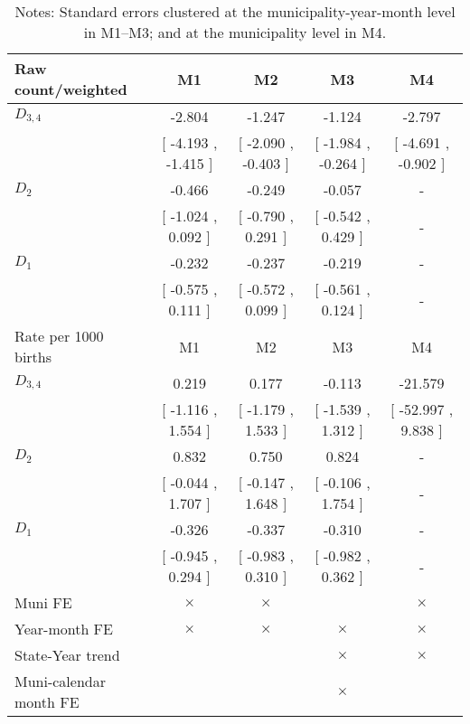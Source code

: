 \begin{table}[!ht]
\centering
\caption{Effects of Drought on macrosom}\label{tab:twfe_macrosom}
\fontsize{10pt}{12pt}\selectfont
\begin{tabular}{lcccc}
\toprule
  Raw count/weighted &\multicolumn{1}{c}{M1}&\multicolumn{1}{c}{M2}&\multicolumn{1}{c}{M3}&\multicolumn{1}{c}{M4} \\
\midrule
 $ D_{3,4} $ &    -2.804 &    -1.247 &    -1.124 &    -2.797 \\ 
 & [    -4.193 ,    -1.415 ] & [    -2.090 ,    -0.403 ] & [    -1.984 ,    -0.264 ] & [    -4.691 ,    -0.902 ] \\ 
\addlinespace
 $ D_2 $ &    -0.466 &    -0.249 &    -0.057 & - \\ 
 & [    -1.024 ,     0.092 ] & [    -0.790 ,     0.291 ] & [    -0.542 ,     0.429 ] & - \\ 
\addlinespace
 $ D_1 $ &    -0.232 &    -0.237 &    -0.219 & - \\ 
 & [    -0.575 ,     0.111 ] & [    -0.572 ,     0.099 ] & [    -0.561 ,     0.124 ] & - \\ 
\addlinespace
\midrule
  Rate per 1000 births &\multicolumn{1}{c}{M1}&\multicolumn{1}{c}{M2}&\multicolumn{1}{c}{M3}&\multicolumn{1}{c}{M4} \\
\midrule
 $ D_{3,4} $ &     0.219 &     0.177 &    -0.113 &   -21.579 \\ 
 & [    -1.116 ,     1.554 ] & [    -1.179 ,     1.533 ] & [    -1.539 ,     1.312 ] & [   -52.997 ,     9.838 ] \\ 
\addlinespace
 $ D_2 $ &     0.832 &     0.750 &     0.824 & - \\ 
 & [    -0.044 ,     1.707 ] & [    -0.147 ,     1.648 ] & [    -0.106 ,     1.754 ] & - \\ 
\addlinespace
 $ D_1 $ &    -0.326 &    -0.337 &    -0.310 & - \\ 
 & [    -0.945 ,     0.294 ] & [    -0.983 ,     0.310 ] & [    -0.982 ,     0.362 ] & - \\ 
\midrule
  Muni FE & $ \times $ & $ \times $ &  & $ \times $  \\
  Year-month FE & $ \times $ & $ \times $ & $ \times $ & $ \times $ \\
  State-Year trend &  &  & $ \times $ & $ \times $ \\
  Muni-calendar month FE &  &  & $ \times $ & \\
\bottomrule
\end{tabular}
\caption*{\footnotesize{Notes: Standard errors clustered at the municipality-year-month level in M1--M3; and at the municipality level in M4.}}
\end{table}
